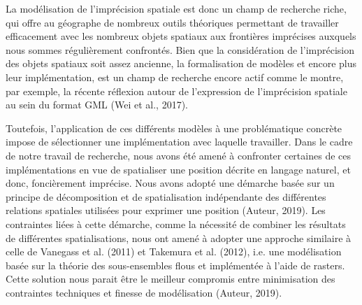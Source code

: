 La modélisation de l’imprécision spatiale est donc un champ de
recherche riche, qui offre au géographe de nombreux outils théoriques
permettant de travailler efficacement avec les nombreux objets
spatiaux aux frontières imprécises auxquels nous sommes régulièrement
confrontés. Bien que la considération de l’imprécision des objets
spatiaux soit assez ancienne, la formalisation de modèles et encore
plus leur implémentation, est un champ de recherche encore actif comme
le montre, par exemple, la récente réflexion autour de l’expression de
l’imprécision spatiale au sein du format GML (Wei et al., 2017).

Toutefois, l’application de ces différents modèles à une problématique
concrète impose de sélectionner une implémentation avec laquelle
travailler. Dans le cadre de notre travail de recherche, nous avons
été amené à confronter certaines de ces implémentations en vue de
spatialiser une position décrite en langage naturel, et donc,
foncièrement imprécise. Nous avons adopté une démarche basée sur un
principe de décomposition et de spatialisation indépendante des
différentes relations spatiales utilisées pour exprimer une position
(Auteur, 2019). Les contraintes liées à cette démarche, comme la
nécessité de combiner les résultats de différentes spatialisations,
nous ont amené à adopter une approche similaire à celle de Vanegass et
al. (2011) et Takemura et al. (2012), i.e. une modélisation basée sur
la théorie des sous-ensembles flous et implémentée à l’aide de
rasters. Cette solution nous parait être le meilleur compromis entre
minimisation des contraintes techniques et finesse de modélisation
(Auteur, 2019).
 
